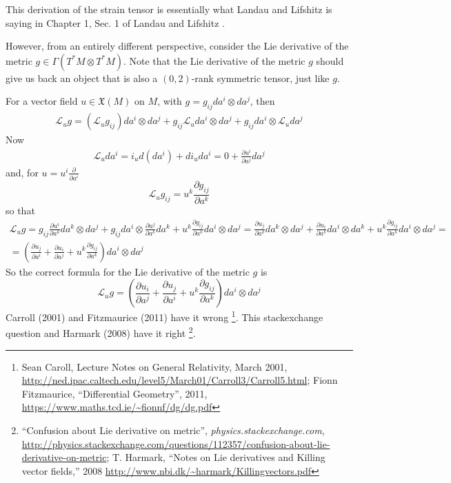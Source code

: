 \documentclass[twoside,landscape,10pt]{amsart}
\theoremstyle{plain}
\theoremstyle{definition}
\theoremstyle{remark}
\begin{document}
\begin{multicols*}{2}
This derivation of the strain tensor is essentially what Landau and Lifshitz is saying in Chapter 1, Sec. 1 of Landau and Lifshitz \cite{LLandauELifshitz1970}.

However, from an entirely different perspective, consider the Lie derivative of the metric $g \in \Gamma(T^*M\otimes T^*M)$.  Note that the Lie derivative of the metric $g$ should give us back an object that is also a $(0,2)$-rank symmetric tensor, just like $g$.  

For a vector field $u \in \mathfrak{X}(M)$ on $M$, with $g = g_{ij} da^i \otimes da^j$, then
\[
\begin{gathered}
  \mathcal{L}_u g = (\mathcal{L}_u g_{ij}) da^i \otimes da^j + g_{ij} \mathcal{L}_u da^i \otimes da^j + g_{ij} da^i \otimes \mathcal{L}_u da^j
\end{gathered}
\]
Now
\[
\begin{gathered}
  \mathcal{L}_u da^i = i_u d(da^i) + di_u da^i = 0 + \frac{ \partial u^i }{ \partial a^j} da^j
\end{gathered}
\]
and, for $u = u^i \frac{ \partial }{ \partial a^i}$
\[
\mathcal{L}_u g_{ij} = u^k \frac{  \partial g_{ij}}{ \partial a^k}
\]
so that 
\[
\begin{gathered}
  \mathcal{L}_u g = g_{ij} \frac{ \partial u^i}{ \partial a^k} da^k \otimes da^j + g_{ij} da^i \otimes \frac{ \partial u^j}{ \partial a^k} da^k + u^k \frac{ \partial g_{ij}}{ \partial a^k} da^i \otimes da^j =  \frac{ \partial u_j }{ \partial a^k} da^k \otimes da^j + \frac{ \partial u_i }{ \partial a^k} da^i \otimes da^k + u^k \frac{ \partial g_{ij} }{ \partial a^k} da^i \otimes da^j   = \\
  =\left(  \frac{ \partial u_j }{ \partial a^i} + \frac{ \partial u_i}{ \partial a^j} + u^k \frac{ \partial g_{ij}}{ \partial a^k} \right) da^i \otimes da^j
\end{gathered}
\]
So the correct formula for the Lie derivative of the metric $g$ is 
\[
  \mathcal{L}_ug = \left(  \frac{ \partial u_i}{ \partial a^j} + \frac{ \partial u_j }{ \partial a^i} +  u^k \frac{ \partial g_{ij}}{ \partial a^k} \right) da^i \otimes da^j 
\]
Carroll (2001) and Fitzmaurice (2011) have it wrong \footnote{Sean Caroll, Lecture Notes on General Relativity, March 2001, \url{http://ned.ipac.caltech.edu/level5/March01/Carroll3/Carroll5.html}; Fionn Fitzmaurice, ``Differential Geometry'', 2011, \url{https://www.maths.tcd.ie/~fionnf/dg/dg.pdf}}.  This stackexchange question and Harmark (2008) have it right \footnote{``Confusion about Lie derivative on metric'', \emph{physics.stackexchange.com}, \url{http://physics.stackexchange.com/questions/112357/confusion-about-lie-derivative-on-metric}; T. Harmark, ``Notes on Lie derivatives and Killing vector fields,'' 2008 \url{http://www.nbi.dk/~harmark/Killingvectors.pdf}}.  


\end{multicols*}
\end{document}
